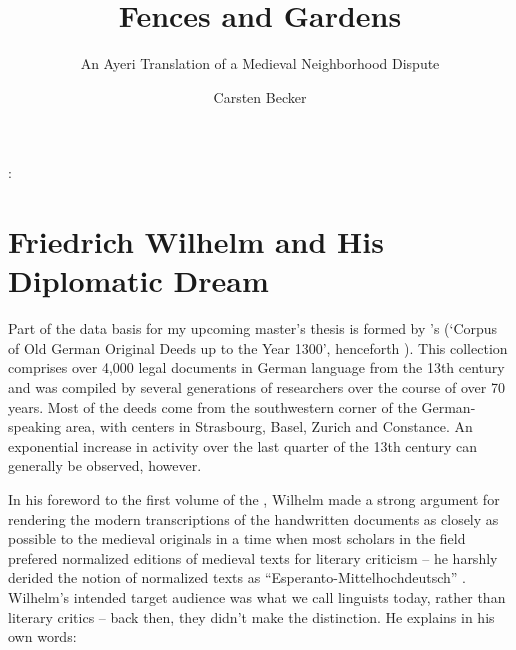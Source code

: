 \documentclass[12pt,paper=a4]{scrartcl}
\author{Carsten Becker}
\title{Fences and Gardens}
\subtitle{An Ayeri Translation of a Medieval Neighborhood Dispute}
\newenvironment{mytitle}{
    \hfill
    \begin{minipage}{0.667\textwidth}
	\vspace{\baselineskip}
	\begin{center}
	    \Large
	    \sffamily\bfseries
	    \makeatletter
}{
	    \makeatother
	\end{center}
	\vspace{1em}
    \end{minipage}
    \hfill
}
\begin{document}

\begin{mytitle}
    \@title: \@subtitle
\end{mytitle}

\section{Friedrich Wilhelm and His Diplomatic Dream}
Part of the data basis for my upcoming master's thesis is formed 
by \citeauthor{CAO}'s  (\enquote*{Corpus of Old German Original 
Deeds up to the Year 1300}, henceforth ). This collection 
comprises over 4,000 legal documents in German language from the 13th century 
and was compiled by several generations of researchers over the course of over 
70 years. Most of the deeds come from the southwestern corner of the 
German-speaking area, with centers in Strasbourg, Basel, Zurich and Constance. 
An exponential increase in activity over the last quarter of the 13th century 
can generally be observed, however.

In his foreword to the first volume of the , Wilhelm made a 
strong argument for rendering the modern transcriptions of the handwritten 
documents as closely as possible to the medieval originals in a time when most 
scholars in the field prefered normalized editions of medieval texts for 
literary criticism – he harshly derided the notion of normalized texts as 
\enquote{Esperanto-Mittelhochdeutsch} \autocite[see][VIII--IX]{CAO1}. Wilhelm's 
intended target audience was what we call linguists today, rather than literary 
critics -- back then, they didn't make the distinction. He explains in his own 
words:
\end{document}
